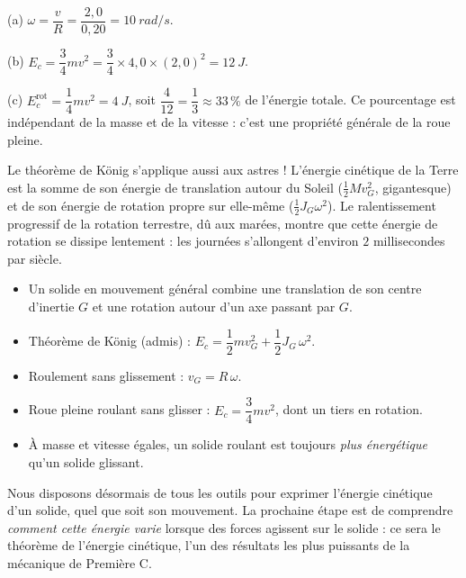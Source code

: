 \documentclass[11pt]{article}
\newcommand{\cle}[1]{{\popxbold\color{popdark}#1}}
\begin{document}
\begin{corrige}
(a) $\omega = \dfrac{v}{R} = \dfrac{2{,}0}{0{,}20} = \SI{10}{rad/s}$.

(b) $E_c = \dfrac{3}{4}mv^2 = \dfrac{3}{4}\times 4{,}0\times (2{,}0)^2 = \SI{12}{J}$.

(c) $E_c^{\text{rot}} = \dfrac{1}{4}mv^2 = \SI{4}{J}$, soit $\dfrac{4}{12} = \dfrac{1}{3} \approx 33\,\%$ de l'énergie totale. Ce pourcentage est indépendant de la masse et de la vitesse : c'est une propriété générale de la roue pleine.
\end{corrige}

\begin{savaistu}
Le théorème de König s'applique aussi aux astres ! L'énergie cinétique de la Terre est la somme de son énergie de translation autour du Soleil ($\frac{1}{2}Mv_G^2$, gigantesque) et de son énergie de rotation propre sur elle-même ($\frac{1}{2}J_G\omega^2$). Le ralentissement progressif de la rotation terrestre, dû aux marées, montre que cette énergie de rotation se dissipe lentement : les journées s'allongent d'environ $2$ millisecondes par siècle.
\end{savaistu}

\begin{aretenir}
\begin{itemize}
\item Un solide en mouvement général combine une \cle{translation} de son centre d'inertie $G$ et une \cle{rotation} autour d'un axe passant par $G$.
\item Théorème de König (admis) : $E_c = \dfrac{1}{2}mv_G^2 + \dfrac{1}{2}J_G\,\omega^2$.
\item Roulement sans glissement : $v_G = R\,\omega$.
\item Roue pleine roulant sans glisser : $E_c = \dfrac{3}{4}mv^2$, dont un tiers en rotation.
\item À masse et vitesse égales, un solide roulant est toujours \emph{plus énergétique} qu'un solide glissant.
\end{itemize}
\end{aretenir}

Nous disposons désormais de tous les outils pour exprimer l'énergie cinétique d'un solide, quel que soit son mouvement. La prochaine étape est de comprendre \emph{comment cette énergie varie} lorsque des forces agissent sur le solide : ce sera le \cle{théorème de l'énergie cinétique}, l'un des résultats les plus puissants de la mécanique de Première C.
\end{document}
